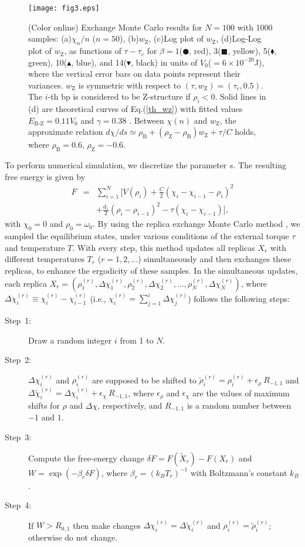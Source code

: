 \documentclass[pre,showpacs,twocolumn,superscriptaddress]{revtex4}
\begin{document}
\begin{figure}[t]
\texttt{[image: fig3.eps]}\\
\caption{(Color online) 
Exchange Monte Carlo results
for $N=100$ with 1000 samples:
(a)$\chi_n/n$ ($n=50$),
(b)$w_\text{Z}$, 
(c)Log plot of $w_\text{Z}$, 
(d)Log-Log plot of $w_\text{Z}$, 
as functions of $\tau-\tau_c$
for $\beta
 =1$($\CIRCLE$, red), 3($\blacksquare$, yellow),
5($\blacklozenge$, green), 10($\blacktriangle$,
 blue), and 14($\blacktriangledown$, black) 
in units of $V_0$($=6\times 10^{-20}$J),
where
the vertical error bars on data points represent their variances.
$w_\text{Z}$ is symmetric with respect to $(\tau,w_\text{Z})=(\tau_c,0.5)$.
The $i$-th bp is considered to be Z-structure if $\rho_i<0$.
Solid lines in (d) are theoretical curves of Eq.(\ref{th_wz})
with fitted values 
$E_{\text{B-Z}}=0.11 V_0$ and
$\gamma=0.38$ 
\cite{kinknote0}.
Between $\chi(n)$ and $w_\text{Z}$, the approximate relation
$
d\chi/ds \simeq \rho_\text{B}+(\rho_\text{Z}-\rho_\text{B}) w_\text{Z}+\tau/C
$
holds,
where $\rho_\text{B}=0.6$, $\rho_\text{Z}=-0.6$.
}
\label{slope_t}
\end{figure}
To perform numerical simulation,
we discretize the parameter $s$.
The resulting free energy is given by
\begin{eqnarray*}
F&=&
\sum_{i=1}^{N}
[
V(\rho_i)
+\frac{C}{2}(\chi_{i}-\chi_{i-1}-\rho_i )^2\\
&&
+
\frac{d_1}{2}(\rho_{i}-\rho_{i-1})^2
-\tau (\chi_{i}-\chi_{i-1})],
\end{eqnarray*}
with $\chi_0=0$ and $\rho_0=\omega_0$.
By using the replica exchange Monte Carlo method \cite{exchangeMC},
we sampled the equilibrium states,
under various conditions of
the external torque $\tau $ and  temperature $T$.
With every step, this method 
updates all replicas $X_r$ 
with different temperatures $T_r $ ($r=1,2,\dots$) simultaneously
and then exchanges these replicas, 
to enhance the ergodicity of these samples.
In the simultaneous updates,
each replica
$X_r=(\rho^{(r)}_1,\Delta\chi^{(r)}_1,\rho^{(r)}_2,\Delta\chi^{(r)}_2,\dots,\rho^{(r)}_N,\Delta\chi^{(r)}_N)$,
where $\Delta \chi^{(r)}_i \equiv \chi^{(r)}_i-\chi^{(r)}_{i-1}$
(i.e.,
$\chi^{(r)}_i=\sum_{j=1}^i \Delta \chi^{(r)}_j$)
follows  the following steps:
\begin{description}
\item[Step~1:]
Draw a random integer $i$ from 1 to $N$.
\item[Step~2:]
$\Delta \chi^{(r)}_i$ and $\rho^{(r)}_i$
are supposed to be shifted to
$ \tilde{\rho}^{(r)}_i =\rho^{(r)}_i+\epsilon_\rho \ R_{-1,1}$ 
and
$\Delta\tilde{\chi}^{(r)}_i=\Delta \chi^{(r)}_i+\epsilon_\chi \ R_{-1,1}$,
where 
$\epsilon_\rho$ and 
$\epsilon_\chi$ are 
the values of maximum shifts for $\rho$ and $\Delta \chi$, respectively,
and
$ R_{-1,1}$ is a random number between $-1$ and $1$.
\item[Step~3:]
Compute the free-energy change $\delta F =F(\tilde{X}_r)-F(X_r)$
and 
$W=\exp(-\beta_r \delta F)$,
where $\beta_r=(k_B T_r)^{-1}$ with Boltzmann's constant $k_B$.
\item[Step~4:]
If $W>R_{0,1}$ then
make changes
$\Delta \chi^{(r)}_i=\Delta\tilde{\chi}^{(r)}_i$ and 
$\rho^{(r)}_i=\tilde{\rho}^{(r)}_i$;
otherwise do not change.
\end{description}
\end{document}

